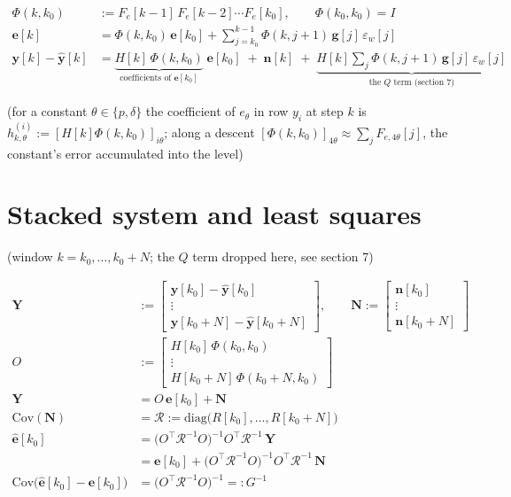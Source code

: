 \documentclass[11pt,a4paper,fontset=none]{ctexart}
\newcommand{\dl}{\delta}
\newcommand{\Phik}{\Phi(k,k_0)}
\begin{document}
\begin{align*}
\Phik &:= F_e[k-1]\,F_e[k-2]\cdots F_e[k_0], \qquad \Phi(k_0,k_0) = I \\
\mathbf{e}[k] &= \Phik\,\mathbf{e}[k_0] + \sum_{j=k_0}^{k-1}\Phi(k,j+1)\,\mathbf{g}[j]\,\varepsilon_w[j] \\
\mathbf{y}[k] - \hat{\mathbf{y}}[k] &= \underbrace{H[k]\,\Phik}_{\text{coefficients of } \mathbf{e}[k_0]}\;\mathbf{e}[k_0]
   \;+\; \mathbf{n}[k]
   \;+\; \underbrace{H[k]\sum_{j}\Phi(k,j+1)\,\mathbf{g}[j]\,\varepsilon_w[j]}_{\text{the } Q \text{ term (section 7)}}
\end{align*}

(for a constant $\theta \in \{p, \dl\}$ the coefficient of $e_\theta$ in row $y_i$ at step $k$ is $h^{(i)}_{k,\theta} := [H[k]\Phik]_{i\theta}$;
along a descent $[\Phik]_{4\theta} \approx \sum_{j} F_{e,4\theta}[j]$, the constant's error accumulated into the level)

\section{Stacked system and least squares}

(window $k = k_0,\dots,k_0+N$; the $Q$ term dropped here, see section 7)

\begin{align*}
\mathbf{Y} &:= \begin{bmatrix} \mathbf{y}[k_0]-\hat{\mathbf{y}}[k_0] \\ \vdots \\ \mathbf{y}[k_0+N]-\hat{\mathbf{y}}[k_0+N] \end{bmatrix},\qquad
\mathbf{N} := \begin{bmatrix} \mathbf{n}[k_0] \\ \vdots \\ \mathbf{n}[k_0+N] \end{bmatrix} \\[4pt]
O &:= \begin{bmatrix} H[k_0]\,\Phi(k_0,k_0) \\ \vdots \\ H[k_0+N]\,\Phi(k_0+N,k_0) \end{bmatrix} \\[4pt]
\mathbf{Y} &= O\,\mathbf{e}[k_0] + \mathbf{N} \\
\mathrm{Cov}(\mathbf{N}) &= \mathcal{R} := \mathrm{diag}\bigl(R[k_0],\dots,R[k_0+N]\bigr) \\[6pt]
\hat{\mathbf{e}}[k_0] &= \bigl(O^{\top}\mathcal{R}^{-1}O\bigr)^{-1}O^{\top}\mathcal{R}^{-1}\,\mathbf{Y} \\
                      &= \mathbf{e}[k_0] + \bigl(O^{\top}\mathcal{R}^{-1}O\bigr)^{-1}O^{\top}\mathcal{R}^{-1}\,\mathbf{N} \\[4pt]
\mathrm{Cov}\bigl(\hat{\mathbf{e}}[k_0] - \mathbf{e}[k_0]\bigr) &= \bigl(O^{\top}\mathcal{R}^{-1}O\bigr)^{-1} =: G^{-1}
\end{align*}
\end{document}
